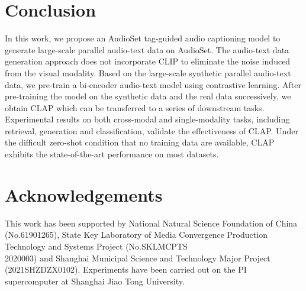 \documentclass[sigconf,anonymous,review]{acmart}
\begin{document}
\section{Conclusion}

In this work, we propose an AudioSet tag-guided audio captioning model to generate large-scale parallel audio-text data on AudioSet.
The audio-text data generation approach does not incorporate CLIP to eliminate the noise induced from the visual modality. 
Based on the large-scale synthetic parallel audio-text data, we pre-train a bi-encoder audio-text model using contrastive learning.
After pre-training the model on the synthetic data and the real data successively, we obtain CLAP which can be transferred to a series of downstream tasks.
Experimental results on both cross-modal and single-modality tasks, including retrieval, generation and classification, validate the effectiveness of CLAP.
Under the difficult zero-shot condition that no training data are available, CLAP exhibits the state-of-the-art performance on most datasets. 

\section{Acknowledgements}
This work has been supported by National Natural Science Foundation of China (No.61901265), State Key Laboratory of Media Convergence Production Technology and Systems Project (No.SKLMCPTS\\2020003) and Shanghai Municipal Science and Technology Major Project (2021SHZDZX0102).
Experiments have been carried out on the PI supercomputer at Shanghai Jiao Tong University.




\end{document}
